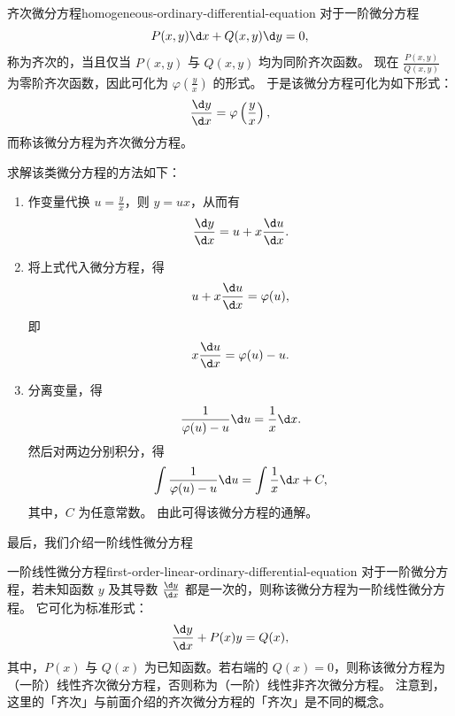 \begin{definition}{齐次微分方程}{homogeneous-ordinary-differential-equation}
    对于一阶微分方程
    \begin{equation}
        P (x, y) \d x + Q (x, y) \d y = 0,
    \end{equation}
    称为齐次的，当且仅当 $ P (x, y) $ 与 $ Q (x, y) $ 均为同阶齐次函数。
    现在 $ \frac{ P (x, y) }{ Q (x, y) } $ 为零阶齐次函数，因此可化为 $ \varphi \left( \frac{y}{x} \right) $ 的形式。
    于是该微分方程可化为如下形式：
    \begin{equation}
        \frac{\d y}{\d x} = \varphi \left( \frac{y}{x} \right),
    \end{equation}
    而称该微分方程为齐次微分方程。
\end{definition}

求解该类微分方程的方法如下：
\begin{enumerate}
    \item 作变量代换 $ u = \frac{y}{x} $，则 $ y = u x $，从而有
          \begin{equation*}
              \frac{\d y}{\d x} = u + x \frac{\d u}{\d x} .
          \end{equation*}
    \item 将上式代入微分方程，得
          \begin{equation*}
              u + x \frac{\d u}{\d x} = \varphi (u) ,
          \end{equation*}
          即
          \begin{equation*}
              x \frac{\d u}{\d x} = \varphi (u) - u .
          \end{equation*}
    \item 分离变量，得
          \begin{equation*}
              \frac{1}{\varphi (u) - u} \d u = \frac{1}{x} \d x .
          \end{equation*}
          然后对两边分别积分，得
          \begin{equation*}
              \int \frac{1}{\varphi (u) - u} \d u = \int \frac{1}{x} \d x + C ,
          \end{equation*}
          其中，$ C $ 为任意常数。
          由此可得该微分方程的通解。
\end{enumerate}
\bigskip

最后，我们介绍一阶线性微分方程

\begin{definition}{一阶线性微分方程}{first-order-linear-ordinary-differential-equation}
    对于一阶微分方程，若未知函数 $ y $ 及其导数 $ \frac{\d y}{\d x} $ 都是一次的，则称该微分方程为一阶线性微分方程。
    它可化为标准形式：
    \begin{equation}
        \frac{\d y}{\d x} + P(x) y = Q(x) \label{eq:first-order-linear-ordinary-differential-equation},
    \end{equation}
    其中，$ P(x) $ 与 $ Q(x) $ 为已知函数。若右端的 $ Q(x) = 0 $，则称该微分方程为（一阶）线性齐次微分方程，否则称为（一阶）线性非齐次微分方程。
    注意到，这里的「齐次」与前面介绍的齐次微分方程的「齐次」是不同的概念。
\end{definition}

